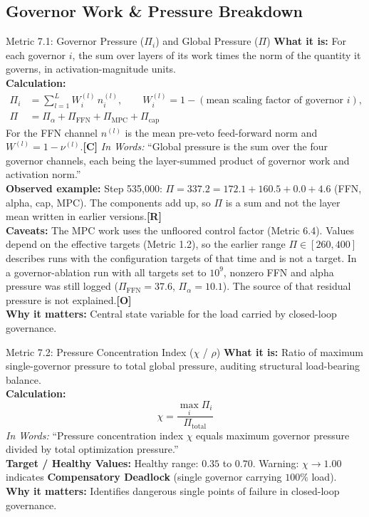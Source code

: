 \documentclass[11pt,a4paper]{article}
\newcommand{\sR}{\textbf{[R]}}
\newcommand{\sC}{\textbf{[C]}}
\newcommand{\sO}{\textbf{[O]}}
\begin{document}
\subsection{Governor Work \& Pressure Breakdown}
\begin{metricbox}{Metric 7.1: Governor Pressure ($\Pi_i$) and Global Pressure ($\Pi$)}
\textbf{What it is:} For each governor $i$, the sum over layers of its work times the norm of the quantity it governs, in activation-magnitude units.\\
\textbf{Calculation:}
$$\begin{aligned}
\Pi_i &= \sum_{l=1}^{L} W_i^{(l)}\, n_i^{(l)}, \qquad W_i^{(l)} = 1 - (\text{mean scaling factor of governor } i),\\
\Pi &= \Pi_\alpha + \Pi_{\text{FFN}} + \Pi_{\text{MPC}} + \Pi_{\text{cap}}
\end{aligned}$$
For the FFN channel $n^{(l)}$ is the mean pre-veto feed-forward norm and $W^{(l)} = 1 - \nu^{(l)}$.\sC{} \emph{In Words:} ``Global pressure is the sum over the four governor channels, each being the layer-summed product of governor work and activation norm.''\\
\textbf{Observed example:} Step 535{,}000: $\Pi = 337.2 = 172.1 + 160.5 + 0.0 + 4.6$ (FFN, alpha, cap, MPC). The components add up, so $\Pi$ is a sum and not the layer mean written in earlier versions.\sR{}\\
\textbf{Caveats:} The MPC work uses the unfloored control factor (Metric 6.4). Values depend on the effective targets (Metric 1.2), so the earlier range $\Pi \in [260, 400]$ describes runs with the configuration targets of that time and is not a target. In a governor-ablation run with all targets set to $10^9$, nonzero FFN and alpha pressure was still logged ($\Pi_{\text{FFN}} = 37.6$, $\Pi_\alpha = 10.1$). The source of that residual pressure is not explained.\sO{}\\
\textbf{Why it matters:} Central state variable for the load carried by closed-loop governance.
\end{metricbox}

\begin{metricbox}{Metric 7.2: Pressure Concentration Index ($\chi$ / $\rho$)}
\textbf{What it is:} Ratio of maximum single-governor pressure to total global pressure, auditing structural load-bearing balance.\\
\textbf{Calculation:}
 $$\chi = \frac{\max_i \Pi_i}{\Pi_{\text{total}}}$$ \emph{In Words:} ``Pressure concentration index $\chi$ equals maximum governor pressure divided by total optimization pressure.''\\
\textbf{Target / Healthy Values:} Healthy range: $0.35$ to $0.70$. Warning: $\chi \to 1.00$ indicates \textbf{Compensatory Deadlock} (single governor carrying $100\%$ load).\\
\textbf{Why it matters:} Identifies dangerous single points of failure in closed-loop governance.
\end{metricbox}
\end{document}
